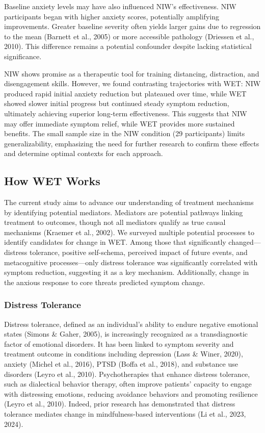 \documentclass[
  man,floatsintext]{apa7}
\begin{document}
Baseline anxiety levels may have also influenced NIW's effectiveness.
NIW participants began with higher anxiety scores, potentially amplifying improvements.
Greater baseline severity often yields larger gains due to regression to the mean (Barnett et al., 2005) or more accessible pathology (Driessen et al., 2010).
This difference remains a potential confounder despite lacking statistical significance.

NIW shows promise as a therapeutic tool for training distancing, distraction, and disengagement skills.
However, we found contrasting trajectories with WET: NIW produced rapid initial anxiety reduction but plateaued over time, while WET showed slower initial progress but continued steady symptom reduction, ultimately achieving superior long-term effectiveness.
This suggests that NIW may offer immediate symptom relief, while WET provides more sustained benefits.
The small sample size in the NIW condition (29 participants) limits generalizability, emphasizing the need for further research to confirm these effects and determine optimal contexts for each approach.

\subsection{How WET Works}\label{how-wet-works}

The current study aims to advance our understanding of treatment mechanisms by identifying potential mediators.
Mediators are potential pathways linking treatment to outcomes, though not all mediators qualify as true causal mechanisms (Kraemer et al., 2002).
We surveyed multiple potential processes to identify candidates for change in WET.
Among those that significantly changed---distress tolerance, positive self-schema, perceived impact of future events, and metacognitive processes---only distress tolerance was significantly correlated with symptom reduction, suggesting it as a key mechanism.
Additionally, change in the anxious response to core threats predicted symptom change.

\subsubsection{Distress Tolerance}\label{distress-tolerance}

Distress tolerance, defined as an individual's ability to endure negative emotional states (Simons \& Gaher, 2005), is increasingly recognized as a transdiagnostic factor of emotional disorders.
It has been linked to symptom severity and treatment outcome in conditions including depression (Lass \& Winer, 2020), anxiety (Michel et al., 2016), PTSD (Boffa et al., 2018), and substance use disorders (Leyro et al., 2010).
Psychotherapies that enhance distress tolerance, such as dialectical behavior therapy, often improve patients' capacity to engage with distressing emotions, reducing avoidance behaviors and promoting resilience (Leyro et al., 2010).
Indeed, prior research has demonstrated that distress tolerance mediates change in mindfulness-based interventions (Li et al., 2023, 2024).
\end{document}
